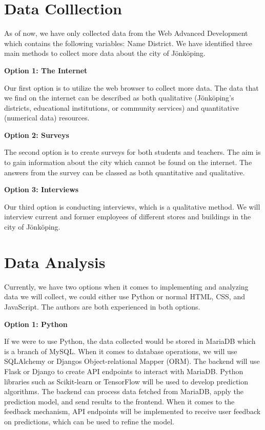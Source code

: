 \section{Data Colllection}

As of now, we have only collected data from the Web Advanced Development which contains the following variables: Name District. We have identified three main methods to collect more data about the city of Jönköping.

\textbf{Option 1: The Internet }


Our first option is to utilize the web browser to collect more data. The data that we find on the internet can be described as both qualitative (Jönköping's districts, educational institutions, or community services) and quantitative (numerical data) resources.


\textbf{Option 2: Surveys}


The second option is to create surveys for both students and teachers. The aim is to gain information about the city which cannot be found on the internet. The answers from the survey can be classed as both quantitative and qualitative. 

\textbf{Option 3: Interviews}


Our third option is conducting interviews, which is a qualitative method. We will interview current and former employees of different stores and buildings in the city of Jönköping.
 

\section{Data Analysis}
Currently, we have two options when it comes to implementing and analyzing data we will collect, we could either use Python or normal HTML, CSS, and JavaScript. The authors are both experienced in both options. 

\textbf{Option 1: Python}


If we were to use Python, the data collected would be stored in MariaDB which is a branch of MySQL. When it comes to database operations, we will use SQLAlchemy or Djangos Object-relational Mapper (ORM). The backend will use Flask or Django to create API endpoints to interact with MariaDB.
Python libraries such as Scikit-learn or TensorFlow will be used to develop prediction algorithms. The backend can process data fetched from MariaDB, apply the prediction model, and send results to the frontend.
When it comes to the feedback mechanism, API endpoints will be implemented to receive user feedback on predictions, which can be used to refine the model.

